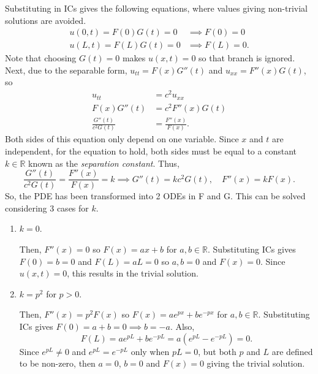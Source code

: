 \documentclass[10pt, a4paper]{article}
\begin{document}
\begin{landscape}
\begin{multicols*}{2}
    Substituting in ICs gives the following equations, where values giving non-trivial solutions are avoided.
    \begin{align*}
        u(0, t) = F(0) G(t) = 0 & \implies F(0) = 0 \\
        u(L, t) = F(L) G(t) = 0 & \implies F(L) = 0.
    \end{align*}
    Note that choosing \(G(t) = 0\) makes \(u(x, t) = 0\) so that branch is ignored.
    Next, due to the separable form, \(u_{tt} = F(x) G''(t)\) and \(u_{xx} = F''(x) G(t)\), so
    \begin{align*}
        u_{tt} &= c^2 u_{xx} \\
        F(x) G''(t) &= c^2 F''(x) G(t) \\
        \frac{G''(t)}{c^2 G(t)} &= \frac{F''(x)}{F(x)}.
    \end{align*}
    Both sides of this equation only depend on one variable. Since \(x\) and \(t\) are independent,
    for the equation to hold, both sides must be equal to a constant \(k \in \mathbb{R}\) known as
    the \emph{separation constant}. Thus,
    \[
        \frac{G''(t)}{c^2 G(t)} = \frac{F''(x)}{F(x)} = k
        \implies
        G''(t) = kc^2 G(t),
        \quad
        F''(x) = k F(x).
    \]
    So, the PDE has been transformed into 2 ODEs in F and G. This can be solved considering 3 cases for \(k\).
    
    \begin{enumerate}
        \item \(k = 0\).
            
            Then, \(F''(x) = 0\) so \(F(x) = ax + b\) for \(a, b \in \mathbb{R}\).
            Substituting ICs gives
            \(F(0) = b = 0\) and \(F(L) = aL = 0\) so \(a, b = 0\) and \(F(x) = 0\).
            Since \(u(x, t) = 0\), this results in the trivial solution.

        \item \(k = p^2\) for \(p > 0\).
        
            Then, \(F''(x) = p^2 F(x)\) so \(F(x) = a e^{px} + b e^{-px}\) for \(a, b \in \mathbb{R}\).
            Substituting ICs gives
            \(F(0) = a + b = 0 \implies b = -a\). Also,
            \[
                F(L) = a e^{pL} + b e^{-pL} = a \left(e^{pL} - e^{-pL}\right) = 0.
            \]
            Since \(e^{pL} \neq 0\) and \(e^{pL} = e^{-pL}\) only when \(pL = 0\), but both \(p\) and \(L\)
            are defined to be non-zero, then \(a = 0\), \(b = 0\) and \(F(x) = 0\) giving the trivial solution.


\end{enumerate}
\end{multicols*}
\end{landscape}
\end{document}
